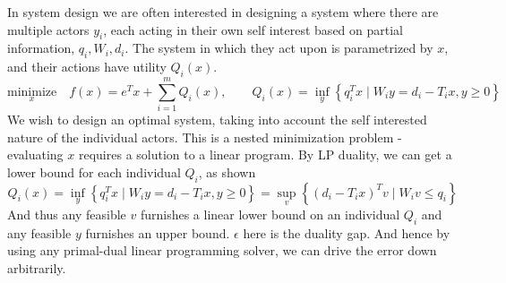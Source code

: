 \begin{example}
In system design we are often interested in designing a system where there are multiple actors $y_i$, each acting in their own self interest based on partial information, $q_i, W_i, d_i.$ The system in which they act upon is parametrized
by $x$, and their actions have utility $Q_i(x)$.
$$
\underset{x}{\mbox{minimize}}\quad f(x) = e^{T}x+\sum_{i=1}^m Q_{i}(x),\qquad Q_{i}(x)=\inf_{y}\left\{ q_{i}^{T}x\mid W_{i}y=d_{i}-T_{i}x,y\geq0\right\} 
$$
We wish to design an optimal system, taking into account the self interested nature of the individual actors. This is a nested minimization problem - evaluating $x$ requires a solution to a linear program. By LP duality, we can get
a lower bound for each individual $Q_i$, as shown
$$
Q_{i}(x)=\inf_{y}\left\{ q_{i}^{T}x\mid W_{i}y=d_{i}-T_{i}x,y\geq0\right\} =\sup_{v}\left\{ (d_{i}-T_{i}x)^{T}v\mid W_{i}v\leq q_{i}\right\} 
$$
And thus any feasible $v$ furnishes a linear lower bound on an individual $Q_i$ and any feasible $y$ furnishes an 
upper bound. $\epsilon$ here is the duality gap. And hence by using any primal-dual linear programming solver, we can drive the error down arbitrarily.


\end{example}

